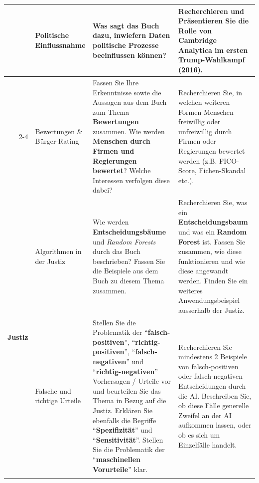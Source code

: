 \begin{landscape}
\begin{longtable}{@{}r|p{5.3cm}||p{10cm}|p{10cm}@{}}
		                              & Politische Einflussnahme              & Was sagt das Buch dazu, inwiefern Daten \textbf{politische Prozesse beeinflussen} können?                                                                                                                                                                                                                                                                                            & Recherchieren und Präsentieren Sie die Rolle von Cambridge Analytica im ersten Trump-Wahlkampf (2016).                                                                                                                                                                           \\\cmidrule(l){2-4}
		                              & Bewertungen \& Bürger-Rating          & Fassen Sie Ihre Erkenntnisse sowie die Aussagen aus dem Buch zum Thema \textbf{Bewertungen} zusammen. Wie werden \textbf{Menschen durch Firmen und Regierungen bewertet}? Welche Interessen verfolgen diese dabei?                                                                                                                                                                            & Recherchieren Sie, in welchen weiteren Formen Menschen freiwillig oder unfreiwillig durch Firmen oder Regierungen bewertet werden (z.B. FICO-Score, Fichen-Skandal etc.).                                                                                                        \\\midrule\midrule
		\multirow{4}{*}{\textbf{Justiz}}       & Algorithmen in der Justiz             & Wie werden \textbf{Entscheidungsbäume} und \textit{Random Forests} durch das Buch beschrieben? Fassen Sie die Beispiele aus dem Buch zu diesem Thema zusammen.                                                                                                                                                                                                                       & Recherchieren Sie, was ein \textbf{Entscheidungsbaum} und was ein \textbf{Random Forest} ist. Fassen Sie zusammen, wie diese funktionieren und wie diese angewandt werden. Finden Sie ein weiteres Anwendungsbeispiel ausserhalb der Justiz.                                                       \\\cmidrule(l){2-4}
		                              & Falsche und richtige Urteile          & Stellen Sie die Problematik der \enquote{\textbf{falsch-positiven}}, \enquote{\textbf{richtig-positiven}}, \enquote{\textbf{falsch-negativen}} und \enquote{\textbf{richtig-negativen}} Vorhersagen / Urteile vor und beurteilen Sie das Thema in Bezug auf die Justiz. Erklären Sie ebenfalls die Begriffe \enquote{\textbf{Spezifizität}} und \enquote{\textbf{Sensitivität}}. Stellen Sie die Problematik der \enquote{\textbf{maschinellen Vorurteile}} klar.                    & Recherchieren Sie mindestens 2 Beispiele von falsch-positiven oder falsch-negativen Entscheidungen durch die AI. Beschreiben Sie, ob diese Fälle generelle Zweifel an der AI aufkommen lassen, oder ob es sich um Einzelfälle handelt.                                           \\\cmidrule(l){2-4}

\end{longtable}
\end{landscape}
